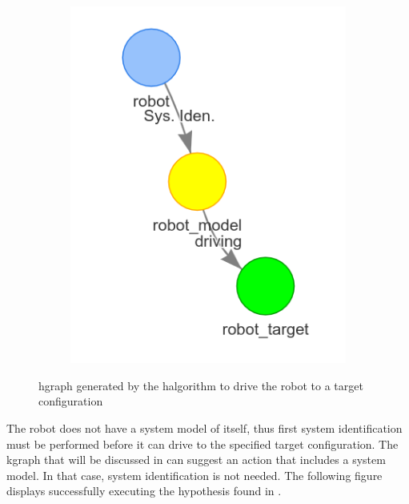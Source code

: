 \begin{figure}[H]
\begin{subfigure}{.3\textwidth}
    \end{subfigure}
    \begin{subfigure}{.3\textwidth}
    \centering
    \includegraphics[width=\textwidth]{figures/connecting_nodes/robot_to_target/robot_iden_drive_target}
    \end{subfigure}
    \caption{\ac{hgraph} generated by the \ac{halgorithm} to drive the robot to a target configuration}%
    \label{fig:robot_drive_hgraph}
\end{figure}

The robot does not have a system model of itself, thus first system identification must be performed before it can drive to the specified target configuration. The \ac{kgraph} that will be discussed in  can suggest an action that includes a system model. In that case, system identification is not needed. The following figure displays successfully executing the hypothesis found in .\bs


